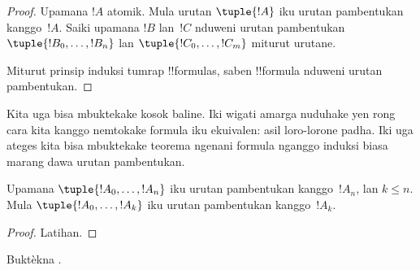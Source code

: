 \documentclass[../../../include/open-logic-section]{subfiles}
\begin{document}
\begin{proof}
Upamana $!A$ atomik. Mula urutan $\tuple{!A}$ iku
urutan pambentukan kanggo~$!A$.
%
Saiki upamana $!B$ lan~$!C$ nduweni urutan pambentukan
$\tuple{!B_0,\dotsc,!B_n}$ lan $\tuple{!C_0,\dotsc,!C_m}$
miturut urutane.
%
\begin{enumerate}
\end{enumerate}
Miturut prinsip induksi tumrap !!{formula}s,
saben !!{formula} nduweni urutan pambentukan.
\end{proof}

Kita uga bisa mbuktekake kosok baline. Iki wigati amarga nuduhake
yen rong cara kita kanggo nemtokake formula iku ekuivalen: asil
loro-lorone padha. Iki uga ateges kita bisa mbuktekake teorema
ngenani formula nganggo induksi biasa marang dawa urutan pambentukan.

\begin{lem}
Upamana $\tuple{!A_0,\dotsc,!A_n}$ iku urutan pambentukan
kanggo~$!A_n$, lan $k \leq n$. Mula $\tuple{!A_0,\dotsc,!A_k}$
iku urutan pambentukan kanggo~$!A_k$.
\end{lem}

\begin{proof}
Latihan.
\end{proof}

\begin{prob}
Buktèkna .
\end{prob}
\end{document}
